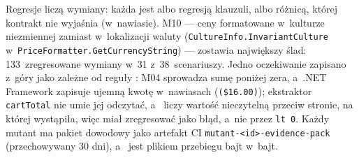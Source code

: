 Regresje liczą wymiany: każda jest albo regresją klauzuli, albo różnicą, której kontrakt
nie wyjaśnia (w~nawiasie). M10 --- ceny formatowane w~kulturze niezmiennej zamiast
w~lokalizacji waluty (\texttt{CultureInfo.InvariantCulture}
w~\texttt{PriceFormatter.GetCurrencyString}) --- zostawia największy ślad: 133~zregresowane
wymiany w~31 z~38~scenariuszy. Jedno oczekiwanie zapisano z~góry jako zależne od reguły
: M04 sprowadza sumę poniżej zera, a~.NET Framework zapisuje ujemną kwotę
w~nawiasach (\texttt{(\$16.00)}); ekstraktor \texttt{cartTotal} nie umie jej odczytać, a~
liczy wartość nieczytelną przeciw stronie, na której wystąpiła, więc
 miał zregresować jako błąd, a~nie przez \texttt{lt 0}.
Każdy mutant ma pakiet dowodowy jako artefakt CI \texttt{mutant-<id>-evidence-pack}
(przechowywany 30 dni), a~ jest plikiem przebiegu bajt
w~bajt.

